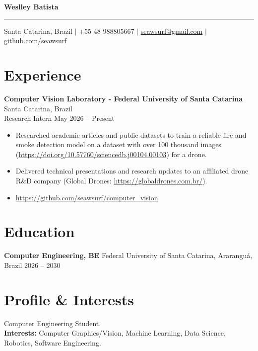 \documentclass[a4paper,10pt]{article}
\begin{document}
\pagestyle{empty} %

\begin{center}
    {\huge \textbf{Weslley Batista}} \\ %
    \vspace{4pt}
    \hrule
    \vspace{6pt}
    {\small
    Santa Catarina, Brazil \quad $|$ \quad
    +55 48 988805667 \quad $|$ \quad
    \href{mailto:seawsurf@gmail.com}{seawsurf@gmail.com} \quad $|$ \quad 
    \href{https://github.com/seawsurf}{github.com/seawsurf}
    }
\end{center}

\section*{Experience}
\noindent
\textbf{Computer Vision Laboratory - Federal University of Santa Catarina} \hfill Santa Catarina, Brazil \\
Research Intern \hfill May 2026 -- Present
\begin{itemize}[leftmargin=*, noitemsep, topsep=0pt]
    \item Researched academic articles and public datasets to train a reliable fire and smoke detection model on a dataset with over 100 thousand images (\url{https://doi.org/10.57760/sciencedb.j00104.00103}) for a drone.
	\item Delivered technical presentations and research updates to an affiliated drone R\&D company (Global Drones: \url{https://globaldrones.com.br/}).
    \item \url{https://github.com/seawsurf/computer_vision}
\end{itemize}


\section*{Education}
\noindent
\textbf{Computer Engineering, BE} \hfill Federal University of Santa Catarina, Araranguá, Brazil \hfill 2026 -- 2030


\section*{Profile \& Interests}
\noindent Computer Engineering Student. \\ 
\textbf{Interests:} Computer Graphics/Vision, Machine Learning, Data Science, Robotics, Software Engineering.
\end{document}

